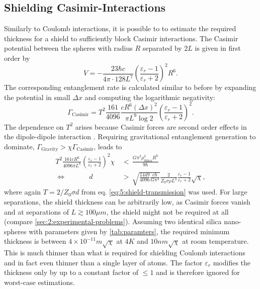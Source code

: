 \subsection{Shielding Casimir-Interactions}
Similarly to Coulomb interactions, it is possible to to estimate the required thickness for a shield to sufficiently block Casimir interactions.
The Casimir potential between the spheres with radius $R$ separated by $2L$ is given in first order by \cite{Emig_2007}
\begin{equation}
  V = -\frac{23 \hbar c}{4\pi \cdot 128 L^7} \left( \frac{\varepsilon_r - 1}{\varepsilon_r + 2} \right)^2 R^6 .
\end{equation}
The corresponding entanglement rate is calculated similar to before by expanding the potential in small $\Delta x$ and computing the logarithmic negativity:
\begin{equation}
  \Gamma_\mathrm{Casimir} = T^2 \frac{161}{4096} \frac{c R^6 (\Delta x)^2}{\pi L^9 \log 2}\left( \frac{\varepsilon_r - 1}{\varepsilon_r + 2}\right)^2 .
\end{equation}
The dependence on $T^2$ arises because Casimir forces are second order effects in the dipole-dipole interaction \cite{Bordag_2001}.
Requiring gravitational entanglement generation to dominate, $\Gamma_\mathrm{Gravity} > \chi \Gamma_\mathrm{Casimir}$, leads to
\begin{align}
  T^2 \frac{161 c R^6}{4096 \pi L^6} \left( \frac{\varepsilon_r - 1}{\varepsilon_r + 2}\right)^2 \chi \, &< \, \frac{G \pi^2 \rho_\mathrm{Silica}^2 R^6}{9\hbar} \\
  \Longleftrightarrow \quad\quad\quad\  d \, &> \, \sqrt{\frac{1449}{4096} \frac{c \hbar}{G \pi^3}} \frac{2}{Z_0 \sigma \rho L^3} \frac{\varepsilon_r - 1}{\varepsilon_r + 2} \sqrt{\chi} ,
\end{align}
where again $T = 2/Z_0 \sigma d$ from eq. \eqref{eq:5:shield-transmission} was used.
For large separations, the shield thickness can be arbitrarily low, as Casimir forces vanish and at separations of $L\gtrsim 100\si{\mu m}$, the shield might not be required at all (compare \cref{sec:2:experimental-problems}).
Assuming two identical silica nano-spheres with parameters given by \cref{tab:paramters}, the required minimum thickness is between $4\times 10^{-11}\si{m} \sqrt{\chi}$ at $4\si{K}$ and $10 \si{nm} \sqrt{\chi}$ at room temperature.
This is much thinner than what is required for shielding Coulomb interactions and in fact even thinner than a single layer of atoms.
The factor $\varepsilon_r$ modifies the thickness only by up to a constant factor of $\leq 1$ and is therefore ignored for worst-case estimations.

